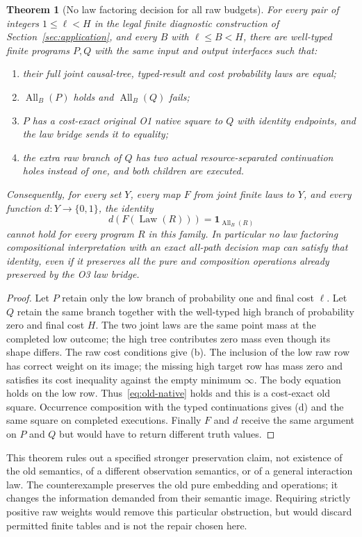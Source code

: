 \documentclass[11pt,a4paper]{article}
\newtheorem{theorem}{Theorem}[section]
\theoremstyle{definition}
\newcommand{\Law}{\operatorname{Law}}
\newcommand{\All}{\operatorname{All}}
\begin{document}
\begin{theorem}[No law factoring decision for all raw budgets]
\label{thm:obstruction}
For every pair of integers $1\leq\ell<H$ in the legal finite
diagnostic construction of Section~\ref{sec:application}, and every
$B$ with $\ell\leq B<H$, there are well-typed finite programs $P,Q$ with
the same input and output interfaces such that:
\begin{enumerate}[label=\textup{(\alph*)}]
\item their full joint causal-tree, typed-result and cost probability
laws are equal;
\item $\All_B(P)$ holds and $\All_B(Q)$ fails;
\item $P$ has a cost-exact original O1 native square to $Q$ with
identity endpoints, and the law bridge sends it to equality;
\item the extra raw branch of $Q$ has two actual resource-separated
continuation holes instead of one, and both children are executed.
\end{enumerate}
Consequently, for every set $Y$, every map $F$ from joint finite laws to
$Y$, and every function $d:Y\to\{0,1\}$, the identity
\[
 d(F(\Law(R)))=\mathbf1_{\All_B(R)}
\]
cannot hold for every program $R$ in this family. In particular no law
factoring compositional interpretation with an exact all-path decision
map can satisfy that identity, even if it preserves all the pure and
composition operations already preserved by the O3 law bridge.
\end{theorem}
\begin{proof}
Let $P$ retain only the low branch of probability one and final cost
$\ell$. Let $Q$ retain the same branch together with the well-typed high
branch of probability zero and final cost $H$. The two joint laws are
the same point mass at the completed low outcome; the high tree contributes
zero mass even though its shape differs. The raw cost conditions give
(b). The inclusion of the low raw row has correct weight on its image;
the missing high target row has mass zero and satisfies its cost inequality
against the empty minimum $\infty$. The body equation holds on the low
row. Thus~\eqref{eq:old-native} holds and this is a cost-exact old square.
Occurrence composition with the typed continuations gives (d) and the
same square on completed executions. Finally $F$ and $d$ receive the same
argument on $P$ and $Q$ but would have to return different truth values.
\end{proof}
This theorem rules out a specified stronger preservation claim, not
existence of the old semantics, of a different observation semantics, or
of a general interaction law. The counterexample preserves the old pure
embedding and operations; it changes the information demanded from their
semantic image. Requiring strictly positive raw weights would remove this
particular obstruction, but would discard permitted finite tables and is
not the repair chosen here.
\end{document}
